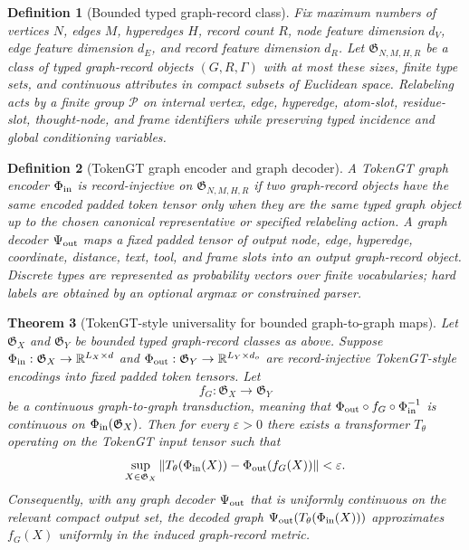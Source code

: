 \documentclass[11pt]{article}
\newtheorem{definition}{Definition}[section]
\newtheorem{theorem}[definition]{Theorem}
\newcommand{\R}{\mathbb{R}}
\newcommand{\1}{\mathbf{1}}
\newcommand{\eps}{\varepsilon}
\begin{document}
\begin{definition}[Bounded typed graph-record class]
Fix maximum numbers of vertices \(N\), edges \(M\), hyperedges \(H\), record count \(R\), node feature dimension \(d_V\), edge feature dimension \(d_E\), and record feature dimension \(d_R\). Let \(\mathfrak G_{N,M,H,R}\) be a class of typed graph-record objects \((G,R,\Gamma)\) with at most these sizes, finite type sets, and continuous attributes in compact subsets of Euclidean space. Relabeling acts by a finite group \(\mathcal P\) on internal vertex, edge, hyperedge, atom-slot, residue-slot, thought-node, and frame identifiers while preserving typed incidence and global conditioning variables.
\end{definition}

\begin{definition}[TokenGT graph encoder and graph decoder]
A TokenGT graph encoder \(\Phi_{\rm in}\) is \emph{record-injective} on \(\mathfrak G_{N,M,H,R}\) if two graph-record objects have the same encoded padded token tensor only when they are the same typed graph object up to the chosen canonical representative or specified relabeling action. A graph decoder \(\Psi_{\rm out}\) maps a fixed padded tensor of output node, edge, hyperedge, coordinate, distance, text, tool, and frame slots into an output graph-record object. Discrete types are represented as probability vectors over finite vocabularies; hard labels are obtained by an optional argmax or constrained parser.
\end{definition}

\begin{theorem}[TokenGT-style universality for bounded graph-to-graph maps]
Let \(\mathfrak G_X\) and \(\mathfrak G_Y\) be bounded typed graph-record classes as above. Suppose \(\Phi_{\rm in}:\mathfrak G_X\to\R^{L_X\times d}\) and \(\Phi_{\rm out}:\mathfrak G_Y\to\R^{L_Y\times d_o}\) are record-injective TokenGT-style encodings into fixed padded token tensors. Let
\[
  f_G:\mathfrak G_X\to\mathfrak G_Y
\]
be a continuous graph-to-graph transduction, meaning that \(\Phi_{\rm out}\circ f_G\circ\Phi_{\rm in}^{-1}\) is continuous on \(\Phi_{\rm in}(\mathfrak G_X)\). Then for every \(\eps>0\) there exists a transformer \(T_\theta\) operating on the TokenGT input tensor such that
\[
  \sup_{X\in\mathfrak G_X}
  \left\|T_\theta(\Phi_{\rm in}(X))-\Phi_{\rm out}(f_G(X))\right\| < \eps .
\]
Consequently, with any graph decoder \(\Psi_{\rm out}\) that is uniformly continuous on the relevant compact output set, the decoded graph \(\Psi_{\rm out}(T_\theta(\Phi_{\rm in}(X)))\) approximates \(f_G(X)\) uniformly in the induced graph-record metric.
\end{theorem}
\end{document}
